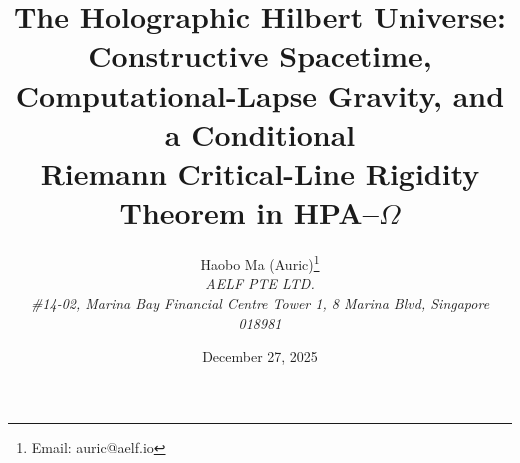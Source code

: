 \documentclass[11pt,a4paper]{article}
\title{The Holographic Hilbert Universe:\\
Constructive Spacetime, Computational-Lapse Gravity, and a Conditional\\
Riemann Critical-Line Rigidity Theorem in HPA--$\Omega$}
\author{Haobo Ma (Auric)\thanks{Email: auric@aelf.io} \\
\textit{AELF PTE LTD.} \\
\textit{\#14-02, Marina Bay Financial Centre Tower 1, 8 Marina Blvd, Singapore 018981}}
\date{December 27, 2025}
\begin{document}
\maketitle














\FloatBarrier
\appendix


\FloatBarrier

\end{document}
